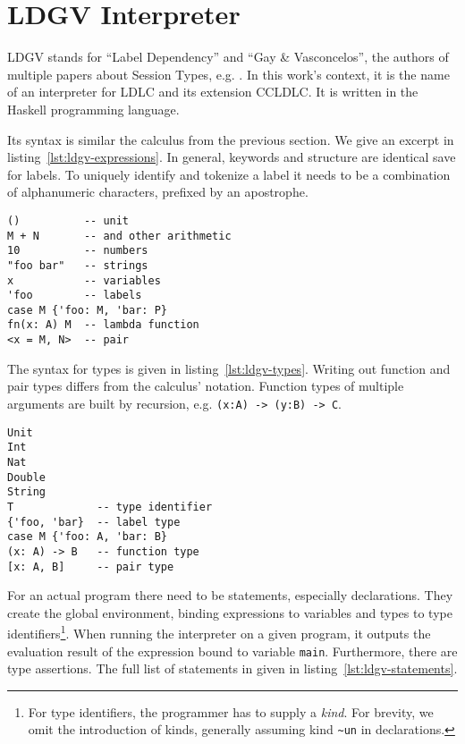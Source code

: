 \section{LDGV Interpreter}

LDGV stands for ``Label Dependency'' and ``Gay \& Vasconcelos'', the authors of multiple papers about Session Types, e.g. \cite{gayvasconcelos2010}. In this work's context, it is the name of an interpreter for LDLC and its extension CCLDLC. It is written in the Haskell programming language.

Its syntax is similar the calculus from the previous section. We give an excerpt in listing~\ref{lst:ldgv-expressions}. In general, keywords and structure are identical save for labels. To uniquely identify and tokenize a label it needs to be a combination of alphanumeric characters, prefixed by an apostrophe.

\begin{lstlisting}[float,language=ldgv,
  caption={Expressions in LDGV (excerpt) with expressions \texttt{M,N,P}, variable \texttt{x} and type \texttt{A}},
  label=lst:ldgv-expressions]
()          -- unit
M + N       -- and other arithmetic
10          -- numbers
"foo bar"   -- strings
x           -- variables
'foo        -- labels
case M {'foo: M, 'bar: P}
fn(x: A) M  -- lambda function
<x = M, N>  -- pair
\end{lstlisting}

The syntax for types is given in listing~\ref{lst:ldgv-types}. Writing out function and pair types differs from the calculus' notation. Function types of multiple arguments are built by recursion, e.g. \texttt{(x:A) -> (y:B) -> C}.

\begin{lstlisting}[float,language=ldgv,
  caption={Types in LDGV (excerpt) with expression \texttt{M}, variable \texttt{x}, type identifier \texttt{T} and types \texttt{A,B}},
  label=lst:ldgv-types]
Unit
Int
Nat
Double
String
T             -- type identifier
{'foo, 'bar}  -- label type
case M {'foo: A, 'bar: B}
(x: A) -> B   -- function type
[x: A, B]     -- pair type
\end{lstlisting}

For an actual program there need to be statements, especially declarations. They create the global environment, binding expressions to variables and types to type identifiers\footnote{For type identifiers, the programmer has to supply a \emph{kind}. For brevity, we omit the introduction of kinds, generally assuming kind \texttt{\textasciitilde un} in declarations.}. When running the interpreter on a given program, it outputs the evaluation result of the expression bound to variable \texttt{main}. Furthermore, there are type assertions. The full list of statements in given in listing~\ref{lst:ldgv-statements}.

